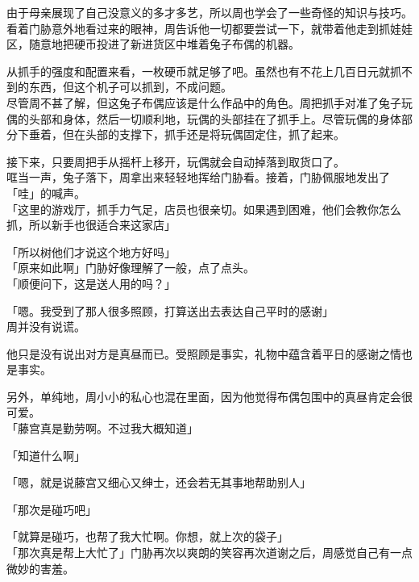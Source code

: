 由于母亲展现了自己没意义的多才多艺，所以周也学会了一些奇怪的知识与技巧。\\

看着门胁意外地看过来的眼神，周告诉他一切都要尝试一下，就带着他走到抓娃娃区，随意地把硬币投进了新进货区中堆着兔子布偶的机器。

从抓手的强度和配置来看，一枚硬币就足够了吧。虽然也有不花上几百日元就抓不到的东西，但这个机子可以抓到，不成问题。\\

尽管周不甚了解，但这兔子布偶应该是什么作品中的角色。周把抓手对准了兔子玩偶的头部和身体，然后一切顺利地，玩偶的头部挂在了抓手上。尽管玩偶的身体部分下垂着，但在头部的支撑下，抓手还是将玩偶固定住，抓了起来。

接下来，只要周把手从摇杆上移开，玩偶就会自动掉落到取货口了。\\

哐当一声，兔子落下，周拿出来轻轻地挥给门胁看。接着，门胁佩服地发出了「哇」的喊声。\\

「这里的游戏厅，抓手力气足，店员也很亲切。如果遇到困难，他们会教你怎么抓，所以新手也很适合来这家店」

「所以树他们才说这个地方好吗」\\

「原来如此啊」门胁好像理解了一般，点了点头。\\

「顺便问下，这是送人用的吗？」

「嗯。我受到了那人很多照顾，打算送出去表达自己平时的感谢」\\

周并没有说谎。

他只是没有说出对方是真昼而已。受照顾是事实，礼物中蕴含着平日的感谢之情也是事实。

另外，单纯地，周小小的私心也混在里面，因为他觉得布偶包围中的真昼肯定会很可爱。\\

「藤宫真是勤劳啊。不过我大概知道」

「知道什么啊」

「嗯，就是说藤宫又细心又绅士，还会若无其事地帮助别人」

「那次是碰巧吧」

「就算是碰巧，也帮了我大忙啊。你想，就上次的袋子」\\

「那次真是帮上大忙了」门胁再次以爽朗的笑容再次道谢之后，周感觉自己有一点微妙的害羞。\\

